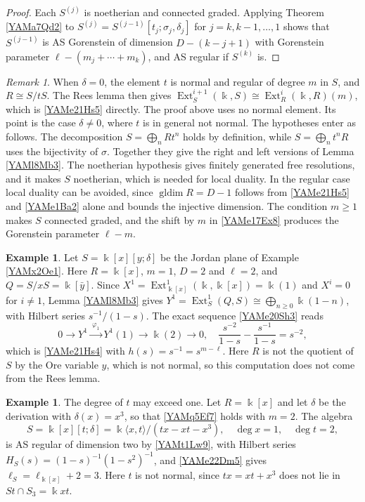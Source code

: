 \documentclass[reqno]{amsart}
\numberwithin{equation}{section}
\theoremstyle{definition}
\newtheorem{example}[equation]{Example}
\theoremstyle{remark}
\newtheorem{remark}[equation]{Remark}
\theoremstyle{plain}
\newcommand{\kk}{\Bbbk}
\DeclareMathOperator{\Ext}{Ext}
\DeclareMathOperator{\gldim}{gldim}
\begin{document}
\begin{proof}
Each $S^{(j)}$ is noetherian and connected graded. Applying Theorem \ref{YAMa7Qd2} to $S^{(j)}=S^{(j-1)}[t_j;\sigma_j,\delta_j]$ for $j=k,k-1,\dots,1$ shows that $S^{(j-1)}$ is AS Gorenstein of dimension $D-(k-j+1)$ with Gorenstein parameter $\ell-(m_j+\cdots+m_k)$, and AS regular if $S^{(k)}$ is.
\end{proof}

\begin{remark}\label{YAMrm3Xa6}
When $\delta=0$, the element $t$ is normal and regular of degree $m$ in $S$, and $R\cong S/tS$. The Rees lemma \cite[Proposition 3.4(b)]{Lev} then gives $\Ext^{i+1}_S(\kk,S)\cong\Ext^i_R(\kk,R)(m)$, which is \eqref{YAMe21Hs5} directly. The proof above uses no normal element. Its point is the case $\delta\neq0$, where $t$ is in general not normal. The hypotheses enter as follows. The decomposition $S=\bigoplus_nRt^n$ holds by definition, while $S=\bigoplus_nt^nR$ uses the bijectivity of $\sigma$. Together they give the right and left versions of Lemma \ref{YAMl8Mb3}. The noetherian hypothesis gives finitely generated free resolutions, and it makes $S$ noetherian, which is needed for local duality. In the regular case local duality can be avoided, since $\gldim R=D-1$ follows from \eqref{YAMe21Hs5} and \eqref{YAMe1Ba2} alone and bounds the injective dimension. The condition $m\ge1$ makes $S$ connected graded, and the shift by $m$ in \eqref{YAMe17Ex8} produces the Gorenstein parameter $\ell-m$.
\end{remark}

\begin{example}\label{YAMex10Jd2}
Let $S=\kk[x][y;\delta]$ be the Jordan plane of Example \ref{YAMx2Oe1}. Here $R=\kk[x]$, $m=1$, $D=2$ and $\ell=2$, and $Q=S/xS=\kk[\bar y]$. Since $X^1=\Ext^1_{\kk[x]}(\kk,\kk[x])=\kk(1)$ and $X^i=0$ for $i\neq1$, Lemma \ref{YAMl8Mb3} gives $Y^1=\Ext^1_S(Q,S)\cong\bigoplus_{n\ge0}\kk(1-n)$, with Hilbert series $s^{-1}/(1-s)$. The exact sequence \eqref{YAMe20Sh3} reads
\[
0\to Y^1\xrightarrow{\ \varphi_1\ }Y^1(1)\to\kk(2)\to0,\quad\frac{s^{-2}}{1-s}-\frac{s^{-1}}{1-s}=s^{-2},
\]
which is \eqref{YAMe21Hs4} with $h(s)=s^{-1}=s^{m-\ell}$. Here $R$ is not the quotient of $S$ by the Ore variable $y$, which is not normal, so this computation does not come from the Rees lemma.
\end{example}

\begin{example}\label{YAMex11Dm3}
The degree of $t$ may exceed one. Let $R=\kk[x]$ and let $\delta$ be the derivation with $\delta(x)=x^3$, so that \eqref{YAMq5Ef7} holds with $m=2$. The algebra
\[
S=\kk[x][t;\delta]=\kk\langle x,t\rangle/(tx-xt-x^3),\quad\deg x=1,\quad\deg t=2,
\]
is AS regular of dimension two by \eqref{YAMt1Lw9}, with Hilbert series $H_S(s)=(1-s)^{-1}(1-s^2)^{-1}$, and \eqref{YAMe22Dm5} gives $\ell_S=\ell_{\kk[x]}+2=3$. Here $t$ is not normal, since $tx=xt+x^3$ does not lie in $St\cap S_3=\kk xt$.
\end{example}
\end{document}
